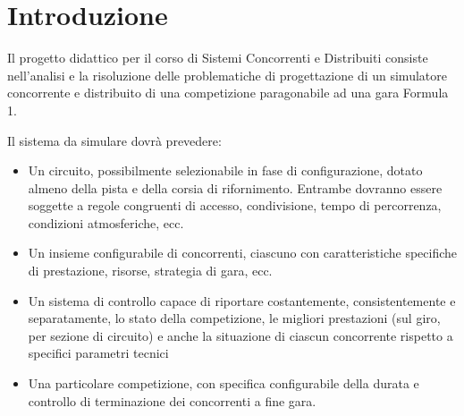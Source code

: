 \documentclass[a4paper,10pt]{book}
\begin{document}
  \chapter{Introduzione}
  
    Il progetto didattico per il corso di Sistemi Concorrenti e Distribuiti consiste nell'analisi e la risoluzione 
    delle problematiche di progettazione di un simulatore concorrente e distribuito 
    di una competizione paragonabile ad una gara Formula 1.

    Il sistema da simulare dovrà prevedere:
    \begin{itemize}
      \item Un circuito, possibilmente selezionabile in fase di configurazione, dotato almeno della pista e della corsia di 
        rifornimento.
        Entrambe dovranno essere soggette a regole congruenti di accesso, condivisione, 
        tempo di percorrenza, condizioni atmosferiche, ecc.
      \item Un insieme configurabile di concorrenti, ciascuno con caratteristiche specifiche di prestazione, risorse, 
        strategia di gara, ecc.
      \item Un sistema di controllo capace di riportare costantemente, consistentemente e separatamente, 
        lo stato della competizione, le migliori prestazioni (sul giro, per sezione di circuito) e anche la 
        situazione di ciascun concorrente rispetto a specifici parametri tecnici
      \item Una particolare competizione, con specifica configurabile della durata e controllo di terminazione 
        dei concorrenti a fine gara.
    \end{itemize}
\end{document}
